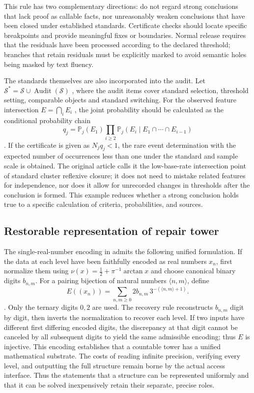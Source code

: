 \documentclass[11pt,a4paper]{article}
\theoremstyle{plain}
\theoremstyle{definition}
\theoremstyle{remark}
\begin{document}
\begin{CJK*}
This rule has two complementary directions: do not regard strong conclusions that lack proof as callable facts, nor unreasonably weaken conclusions that have been closed under established standards. Certificate checks should locate specific breakpoints and provide meaningful fixes or boundaries. Normal release requires that the residuals have been processed according to the declared threshold; branches that retain residuals must be explicitly marked to avoid semantic holes being masked by text fluency.

The standards themselves are also incorporated into the audit. Let $\mathcal S^*=\mathcal S\cup\operatorname{Audit}(\mathcal S)$ , where the audit items cover standard selection, threshold setting, comparable objects and standard switching. For the observed feature intersection $E=\bigcap_iE_i$ , the joint probability should be calculated as the conditional probability chain \[
 q_j=\mathbb P_j(E_1)\prod_{i\ge2}\mathbb P_j(E_i\mid E_1\cap\cdots\cap E_{i-1})
\] . If the certificate is given as $N_jq_j<1$, the rare event determination with the expected number of occurrences less than one under the standard and sample scale is obtained. The original article calls it the low-base-rate intersection point of standard cluster reflexive closure; it does not need to mistake related features for independence, nor does it allow for unrecorded changes in thresholds after the conclusion is formed. This example reduces whether a strong conclusion holds true to a specific calculation of criteria, probabilities, and sources.

\subsection { Restorable representation of repair tower }

The single-real-number encoding in \cite{S22} admits the following unified formulation. If the data at each level have been faithfully encoded as real numbers $x_n$, first normalize them using $\nu(x)=\frac12+\pi^{-1}\arctan x$ and choose canonical binary digits $b_{n,m}$. For a pairing bijection of natural numbers $\langle n,m\rangle$, define
\[
 E((x_n))=\sum_{n,m\ge0}2b_{n,m}\,3^{-(\langle n,m\rangle+1)}.
\].
Only the ternary digits $0,2$ are used. The recovery rule reconstructs $b_{n,m}$ digit by digit, then inverts the normalization to recover each level. If two inputs have different first differing encoded digits, the discrepancy at that digit cannot be canceled by all subsequent digits to yield the same admissible encoding; thus $E$ is injective. This encoding establishes that a countable tower has a unified mathematical substrate. The costs of reading infinite precision, verifying every level, and outputting the full structure remain borne by the actual access interface. Thus the statements that a structure can be represented uniformly and that it can be solved inexpensively retain their separate, precise roles.


\end{CJK*}
\end{document}
